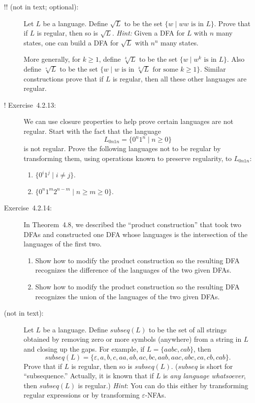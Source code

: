 \documentclass[11pt]{article}
\newcommand{\emptystr}{\varepsilon}
\theoremstyle{plain}
\theoremstyle{definition}
\begin{document}
\begin{description}
\item[!! (not in text; optional):]  Let $L$ be a language.  Define
  $\sqrt L$ to be the set $\{ w\mid \mbox{$ww$ is in $L$} \}$.  Prove
  that if $L$ is regular, then so is $\sqrt L$.  \emph{Hint:} Given a
  DFA for $L$ with $n$ many states, one can build a DFA for
  $\sqrt L$ with $n^n$ many states.

  More generally, for $k\ge 1$, define $\sqrt[k]{L}$ to be the set $\{ w
  \mid \mbox{$w^k$ is in $L$} \}$.  Also define $\sqrt[*]{L}$ to be the
  set $\{ w \mid \mbox{$w$ is in $\sqrt[k]{L}$ for some $k\ge 1$} \}$.
  Similar constructions prove that if $L$ is regular, then all these
  other languages are regular.

\item[! Exercise~4.2.13:] We can use closure properties to help prove
  certain languages are not regular.  Start with the fact that the
  language
  \[ L_{0n1n} = \{0^n1^n \mid n\ge 0\} \]
  is not regular.  Prove the following languages not to be regular
  by transforming them, using operations known to preserve regularity,
  to $L_{0n1n}$:
  \begin{enumerate}[label={\alph*)}]
  \item $\{0^i1^j \mid i\ne j\}$.
  \item $\{0^n1^m2^{n-m} \mid n\ge m \ge 0\}$.
\end{enumerate}
\item[Exercise~4.2.14:] In Theorem~4.8, we described the ``product
  construction'' that took two DFAs and constructed one DFA whose
  languages is the intersection of the languages of the first two.
  \begin{enumerate}
    \renewcommand{\theenumi}{\alph{enumi})}
    \setcounter{enumi}{2}
  \item Show how to modify the product construction so the resulting DFA
    recognizes the difference of the languages of the two given DFAs.
  \item Show how to modify the product construction so the resulting DFA
    recognizes the union of the languages of the two given DFAs.
\end{enumerate}

\item[(not in text):] Let $L$ be a language.  Define
  $\textit{subseq}(L)$ to be the set of all strings obtained by removing
  zero or more symbols (anywhere) from a string in $L$ and closing up
  the gaps.  For example, if $L = \{aabc,cab\}$, then
  \[ \textit{subseq}(L) =
  \{\emptystr,a,b,c,aa,ab,ac,bc,aab,aac,abc,ca,cb,cab\}. \]
  Prove that if $L$ is regular, then so is $\textit{subseq}(L)$.
  ($\textit{subseq}$ is short for ``subsequence.''  Actually, it is
  known that if $L$ is \emph{any language whatsoever}, then
$\textit{subseq}(L)$ is regular.)
\emph{Hint}: You can do this either by transforming regular
expressions or by transforming $\emptystr$-NFAs.


\end{description}
\end{document}
